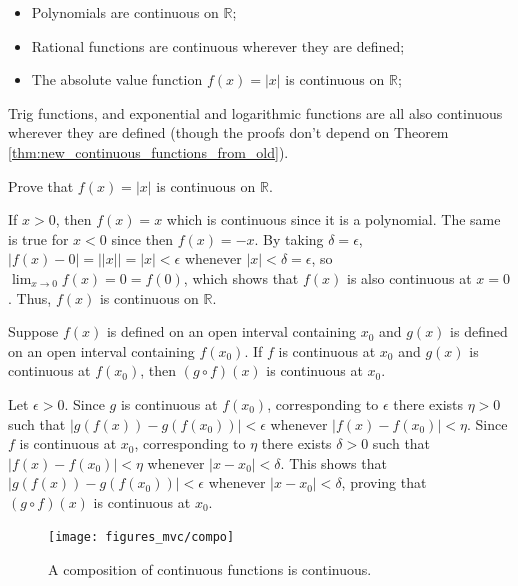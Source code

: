\documentclass[12pt,letterpaper,reqno]{article}
\numberwithin{equation}{section}
\newcommand{\R}{\ensuremath{\mathbb R}}
\begin{document}
{\begin{example}\hspace{15cm}
\begin{itemize}
	\item Polynomials are continuous on $\R$;
	\item Rational functions are continuous wherever they are defined;
	\item The absolute value function $f(x)=|x|$ is continuous on $\R$;
\end{itemize}
Trig functions, and exponential and logarithmic functions are all also continuous wherever they are defined (though the proofs don't depend on Theorem \ref{thm:new_continuous_functions_from_old}).	
\end{example}


\begin{exercise}
Prove that $f(x)=|x|$ is continuous on $\R$.	
\end{exercise}

{\color{red} \begin{solution}
 	If $x>0$, then $f(x)=x$ which is continuous since it is a polynomial. The same is true for $x<0$ since then $f(x)=-x$. By taking $\delta=\epsilon$, $|f(x)-0|=||x||=|x|<\epsilon$ whenever $|x|<\delta=\epsilon$, so $\lim_{x \to 0}f(x)=0=f(0)$, which shows that $f(x)$ is also continuous at $x=0$. Thus, $f(x)$ is continuous on $\R$.
 \end{solution}}

\begin{thm}\label{thm:a_composition_of_continuous_functions_is_continuous}
	Suppose $f(x)$ is defined on an open interval containing $x_0$ and  $g(x)$ is defined on an open interval containing $f(x_0)$. If $f$ is continuous at $x_0$ and $g(x)$ is continuous at $f(x_0)$, then $(g \circ f)(x)$ is continuous at $x_0$.
\end{thm}

\begin{pf}
Let $\epsilon>0$. Since $g$ is continuous at $f(x_0)$, corresponding to $\epsilon$ there exists $\eta>0$ such that $|g(f(x))-g(f(x_0))|<\epsilon$ whenever $|f(x)-f(x_0)|<\eta$. Since $f$ is continuous at $x_0$, corresponding to $\eta$ there exists $\delta>0$ such that $|f(x)-f(x_0)|<\eta$ whenever $|x-x_0|<\delta$. This shows that $|g(f(x))-g(f(x_0))|<\epsilon$ whenever $|x-x_0|<\delta$, proving that $(g \circ f)(x)$ is continuous at $x_0$. 
\begin{figure}[h]
	\begin{center}
		\texttt{[image: figures\_mvc/compo]}
	\end{center}
	\caption{A composition of continuous functions is continuous.}
\end{figure}
\end{pf}

}
\end{document}
